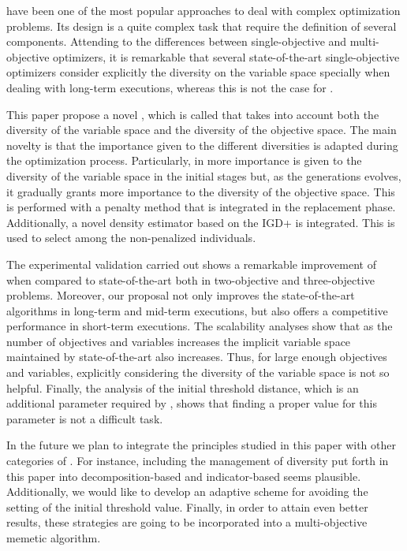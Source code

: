 \EAS{} have been one of the most popular approaches to deal with complex optimization problems.
%
Its design is a quite complex task that require the definition of several components.
%
Attending to the differences between single-objective and multi-objective optimizers, it is remarkable
that several state-of-the-art single-objective optimizers consider explicitly the diversity on the variable space specially
when dealing with long-term executions, whereas this is not the case for \MOEAS{}.
%
%
%

This paper propose a novel \MOEA{}, which is called \VSDMOEA{} that takes into account both the diversity of the variable space
and the diversity of the objective space.
%
The main novelty is that the importance given to the different diversities is adapted during the optimization process.
%
Particularly, in \VSDMOEA{} more importance is given to the diversity of the variable space in the initial stages
but, as the generations evolves, it gradually grants more importance to the diversity of the objective space.
%
This is performed with a penalty method that is integrated in the replacement phase.
%
Additionally, a novel density estimator based on the IGD+ is integrated.
%
This is used to select among the non-penalized individuals.

The experimental validation carried out shows a remarkable improvement of \VSDMOEA{} when compared to state-of-the-art \MOEAS{} both in
two-objective and three-objective problems.
%
Moreover, our proposal not only improves the state-of-the-art algorithms in long-term and mid-term executions,
but also offers a competitive performance in short-term executions.
%
The scalability analyses show that as the number of objectives and variables increases the implicit variable space maintained by state-of-the-art
\MOEAS{} also increases.
%
Thus, for large enough objectives and variables, explicitly considering the diversity of the variable space is not so helpful.
%
Finally, the analysis of the initial threshold distance, which is an additional parameter required by \VSDMOEA{}, shows that finding a proper
value for this parameter is not a difficult task.

In the future we plan to integrate the principles studied in this paper with other categories of \MOEAS{}.
%
For instance, including the management of diversity put forth in this paper into decomposition-based and indicator-based \MOEAS{} seems plausible.
%
Additionally, we would like to develop an adaptive scheme for avoiding the setting of the initial threshold value.
%
Finally, in order to attain even better results, these strategies are going to be incorporated into a multi-objective memetic algorithm.
%
